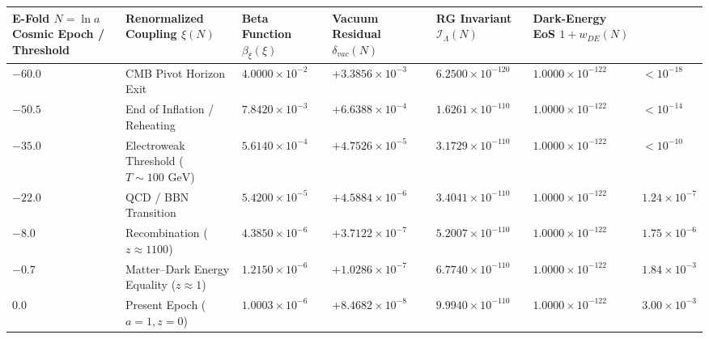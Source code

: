 \documentclass[aps,prd,onecolumn,superscriptaddress,nofootinbib,longbibliography,10pt]{revtex4-2}
\begin{document}
  
\begin{center}
\begin{tabular}{|lllllll|}
\hline

      E-Fold \(N = \ln a\)
        Cosmic Epoch / Threshold & Renormalized Coupling \(\xi(N)\) & Beta Function \(\beta_\xi(\xi)\) & Vacuum Residual \(\delta_{vac}(N)\) & RG Invariant \(\mathcal{I}_\Lambda(N)\) & Dark-Energy EoS \(1 + w_{DE}(N)\)
       \\ \hline

    
    
      \(-60.0\) & CMB Pivot Horizon Exit & \(4.0000 \times 10^{-2}\) & \(+3.3856 \times 10^{-3}\) & \(6.2500 \times 10^{-120}\) & \(1.0000 \times 10^{-122}\) & \(< 10^{-18}\) \\ \hline

      \(-50.5\) & End of Inflation / Reheating & \(7.8420 \times 10^{-3}\) & \(+6.6388 \times 10^{-4}\) & \(1.6261 \times 10^{-110}\) & \(1.0000 \times 10^{-122}\) & \(< 10^{-14}\) \\ \hline

      \(-35.0\) & Electroweak Threshold (\(T \sim 100\text{ GeV}\)) & \(5.6140 \times 10^{-4}\) & \(+4.7526 \times 10^{-5}\) & \(3.1729 \times 10^{-110}\) & \(1.0000 \times 10^{-122}\) & \(< 10^{-10}\) \\ \hline

      \(-22.0\) & QCD / BBN Transition & \(5.4200 \times 10^{-5}\) & \(+4.5884 \times 10^{-6}\) & \(3.4041 \times 10^{-110}\) & \(1.0000 \times 10^{-122}\) & \(1.24 \times 10^{-7}\) \\ \hline

      \(-8.0\) & Recombination (\(z \approx 1100\)) & \(4.3850 \times 10^{-6}\) & \(+3.7122 \times 10^{-7}\) & \(5.2007 \times 10^{-110}\) & \(1.0000 \times 10^{-122}\) & \(1.75 \times 10^{-6}\) \\ \hline

      \(-0.7\) & Matter–Dark Energy Equality (\(z \approx 1\)) & \(1.2150 \times 10^{-6}\) & \(+1.0286 \times 10^{-7}\) & \(6.7740 \times 10^{-110}\) & \(1.0000 \times 10^{-122}\) & \(1.84 \times 10^{-3}\) \\ \hline

      \(0.0\) & Present Epoch (\(a = 1, z = 0\)) & \(1.0003 \times 10^{-6}\) & \(+8.4682 \times 10^{-8}\) & \(9.9940 \times 10^{-110}\) & \(1.0000 \times 10^{-122}\) & \(3.00 \times 10^{-3}\) \\ \hline

    
  \end{tabular}
\end{center}
\end{document}
